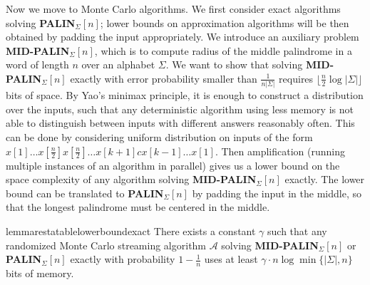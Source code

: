 \documentclass{article}[11pt,letter]
\newcommand{\alg}{\mathcal{A}}
\newcommand{\midpalin}[1][n]{{\bf MID-PALIN}$_{\Sigma}[#1]$\xspace}
\newcommand{\palin}[1][n]{{\bf PALIN}$_{\Sigma}[#1]$\xspace}
\begin{document}
Now we move to Monte Carlo algorithms. We first consider exact algorithms solving \palin;
lower bounds on approximation algorithms will be then obtained by padding the input
appropriately. We introduce an auxiliary problem \midpalin, which is to compute radius
of the middle palindrome in a word of length $n$ over an alphabet $\Sigma$. We want to
show that solving \midpalin exactly with error probability smaller than $\frac{1}{n|\Sigma|}$ requires
$\lfloor\frac{n}{2} \log |\Sigma| \rfloor$ bits of space. By Yao's minimax principle,
it is enough to construct a distribution over the inputs, such that any deterministic algorithm
using less memory is not able to distinguish between inputs with different answers
reasonably often. This can be done by considering uniform distribution on inputs of the form
$x[1]\ldots x[\frac{n}{2}]x[\frac{n}{2}]\ldots x[k+1]c x[k-1] \ldots x[1]$. Then amplification
(running multiple instances of an algorithm in parallel) gives us a lower bound on the space
complexity of any algorithm solving \midpalin exactly. The lower bound can be translated
to \palin by padding the input in the middle, so that the longest palindrome must be centered
in the middle.

\begin{restatable}{lemma}{restatablelowerboundexact}
\label{lowerbound:exact}
There exists a constant  $\gamma$ such that any randomized Monte Carlo streaming algorithm
$\alg$ solving \midpalin or \palin exactly with probability $1-\frac{1}{n}$
uses at least $\gamma \cdot n \log\min \{|\Sigma|, n\}$ bits of memory.
\end{restatable}
\end{document}
